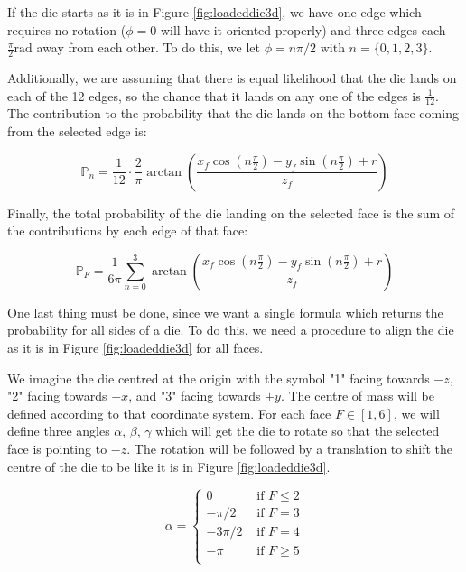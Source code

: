 \documentclass[english,12pt,a4paper,final]{article}
\begin{document}
If the die starts as it is in Figure \ref{fig:loadeddie3d}, we have one edge which requires no rotation ($\phi=0$ will have it oriented properly) and three edges each $\frac{\pi}{2} \text{rad}$ away from each other. To do this, we let $\phi = n\pi/2 \text{ with } n=\{0, 1, 2, 3\}$.

Additionally, we are assuming that there is equal likelihood that the die lands on each of the 12 edges, so the chance that it lands on any one of the edges is $\frac{1}{12}$. The contribution to the probability that the die lands on the bottom face coming from the selected edge is:

\begin{equation*}
	\mathbb{P}_n = \frac{1}{12} \cdot \frac{2}{\pi} \arctan\left(\frac{x_f\cos(n\frac{\pi}{2})-y_f\sin(n\frac{\pi}{2})+r}{z_f}\right)
\end{equation*}

Finally, the total probability of the die landing on the selected face is the sum of the contributions by each edge of that face:

\begin{equation}\label{dieFaceProb}
	\mathbb{P}_F = \frac{1}{6\pi} \sum_{n=0}^{3} \arctan\left(\frac{x_f\cos(n\frac{\pi}{2})-y_f\sin(n\frac{\pi}{2})+r}{z_f}\right)
\end{equation}

One last thing must be done, since we want a single formula which returns the probability for all sides of a die. To do this, we need a procedure to align the die as it is in Figure \ref{fig:loadeddie3d} for all faces.

We imagine the die centred at the origin with the symbol "1" facing towards $-z$, "2" facing towards $+x$, and "3" facing towards $+y$. The centre of mass will be defined according to that coordinate system. For each face $F \in [1, 6] $, we will define three angles $\alpha$, $\beta$, $\gamma$ which will get the die to rotate so that the selected face is pointing to $-z$. The rotation will be followed by a translation to shift the centre of the die to be like it is in Figure \ref{fig:loadeddie3d}.

\begin{equation*}
	\alpha = \begin{cases} 
		0 & \text{ if } F \le 2 \\
		-\pi/2 & \text{ if } F = 3 \\
		-3\pi/2 & \text{ if } F = 4 \\
		-\pi & \text{ if } F \ge 5  \\
	\end{cases}
\end{equation*}
\end{document}

